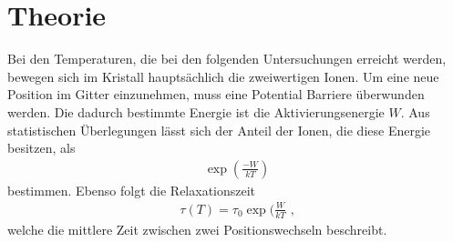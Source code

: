\section{Theorie}
\label{sec:Theorie}
Bei den Temperaturen, die bei den folgenden Untersuchungen erreicht werden, bewegen sich im Kristall hauptsächlich die zweiwertigen Ionen.
Um eine neue Position im Gitter einzunehmen, muss eine Potential Barriere überwunden werden.
Die dadurch bestimmte Energie ist die Aktivierungsenergie $W$.
Aus statistischen Überlegungen lässt sich der Anteil der Ionen, die diese Energie besitzen, als 
\begin{align}
\exp \left(\frac{-W}{kT}\right)
\label{eq:1}
\end{align}
bestimmen.
Ebenso folgt die Relaxationszeit
\begin{align}
\tau(T)=\tau_0 \exp (\frac{W}{kT}\text{ ,}
\label{eq:2}
\end{align}
welche die mittlere Zeit zwischen zwei Positionswechseln beschreibt.

